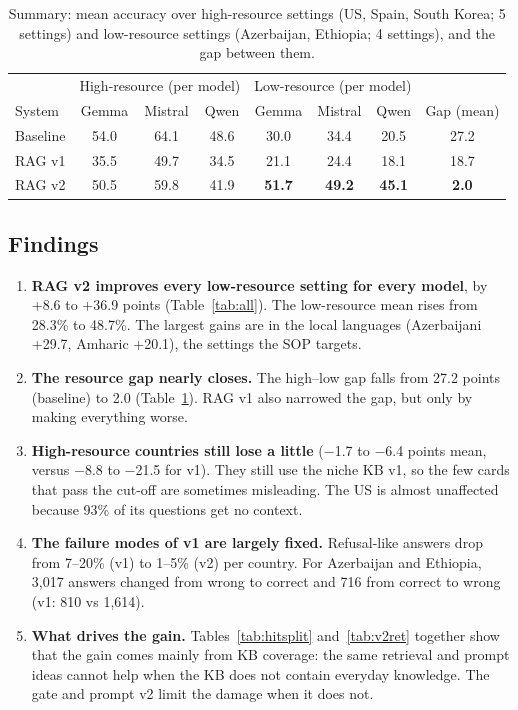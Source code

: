 \documentclass[11pt]{article}
\begin{document}
\begin{table}[h]
\centering
\caption{Summary: mean accuracy over high-resource settings (US, Spain, South Korea; 5 settings) and
low-resource settings (Azerbaijan, Ethiopia; 4 settings), and the gap between them.}
\label{tab:gap}
\begin{tabular}{l|ccc|ccc|c}
\toprule
 & \multicolumn{3}{c|}{High-resource (per model)} & \multicolumn{3}{c|}{Low-resource (per model)} & \\
System & Gemma & Mistral & Qwen & Gemma & Mistral & Qwen & Gap (mean) \\
\midrule
Baseline & 54.0 & 64.1 & 48.6 & 30.0 & 34.4 & 20.5 & 27.2 \\
RAG v1   & 35.5 & 49.7 & 34.5 & 21.1 & 24.4 & 18.1 & 18.7 \\
RAG v2   & 50.5 & 59.8 & 41.9 & \textbf{51.7} & \textbf{49.2} & \textbf{45.1} & \textbf{2.0} \\
\bottomrule
\end{tabular}
\end{table}

\subsection{Findings}
\begin{enumerate}
\item \textbf{RAG v2 improves every low-resource setting for every model}, by +8.6 to +36.9 points
(Table~\ref{tab:all}). The low-resource mean rises from 28.3\% to 48.7\%. The largest gains are in the
local languages (Azerbaijani +29.7, Amharic +20.1), the settings the SOP targets.
\item \textbf{The resource gap nearly closes.} The high--low gap falls from 27.2 points (baseline) to
2.0 (Table~\ref{tab:gap}). RAG v1 also narrowed the gap, but only by making everything worse.
\item \textbf{High-resource countries still lose a little} ($-$1.7 to $-$6.4 points mean, versus
$-$8.8 to $-$21.5 for v1). They still use the niche KB v1, so the few cards that pass the cut-off
are sometimes misleading. The US is almost unaffected because 93\% of its questions get no context.
\item \textbf{The failure modes of v1 are largely fixed.} Refusal-like answers drop from 7--20\% (v1) to
1--5\% (v2) per country. For Azerbaijan and Ethiopia, 3{,}017 answers changed from wrong to correct and
716 from correct to wrong (v1: 810 vs 1{,}614).
\item \textbf{What drives the gain.} Tables~\ref{tab:hitsplit} and~\ref{tab:v2ret} together show that
the gain comes mainly from KB coverage: the same retrieval and prompt ideas cannot help when the KB
does not contain everyday knowledge. The gate and prompt v2 limit the damage when it does not.
\end{enumerate}
\end{document}
